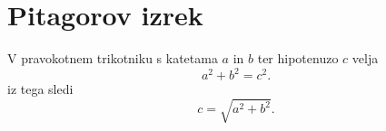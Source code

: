 \documentclass{article}
\begin{document}
\section*{Pitagorov izrek}
V pravokotnem trikotniku s katetama \(a\) in \(b\) ter hipotenuzo \(c\) velja
\[ a^2 + b^2 = c^2 .\] iz tega sledi 
\[ c = \sqrt{a^2 + b^2}.\]
\end{document}
